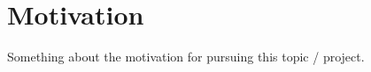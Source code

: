 
\section{Motivation}
\label{chpIntro-secMotive}

Something about the motivation for pursuing this topic / project.

